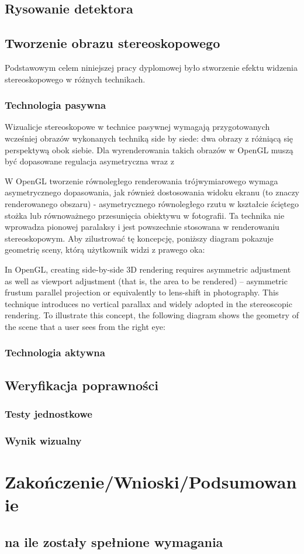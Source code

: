 \subsection{Rysowanie detektora}
\subsection{Tworzenie obrazu stereoskopowego}
Podstawowym celem niniejszej pracy dyplomowej było stworzenie efektu widzenia stereoskopowego w różnych technikach.
\subsubsection{Technologia pasywna}
Wizualicje stereoskopowe w technice pasywnej wymagają przygotowanych wcześniej obrazów wykonanych techniką side by siede: dwa obrazy z różniącą się perspektywą obok siebie. Dla wyrenderowania takich obrazów w OpenGL muszą być dopasowane regulacja asymetryczna wraz z 

W OpenGL tworzenie równoległego renderowania trójwymiarowego wymaga asymetrycznego dopasowania, jak również dostosowania widoku ekranu (to znaczy renderowanego obszaru) - asymetrycznego równoległego rzutu w kształcie ściętego stożka lub równoważnego przesunięcia obiektywu w fotografii. Ta technika nie wprowadza pionowej paralaksy i jest powszechnie stosowana w renderowaniu stereoskopowym. Aby zilustrować tę koncepcję, poniższy diagram pokazuje geometrię sceny, którą użytkownik widzi z prawego oka:




In OpenGL, creating side-by-side 3D rendering requires asymmetric adjustment as well as viewport adjustment (that is, the area to be rendered) – asymmetric frustum parallel projection or equivalently to lens-shift in photography. This technique introduces no vertical parallax and widely adopted in the stereoscopic rendering. To illustrate this concept, the following diagram shows the geometry of the scene that a user sees from the right eye:


\subsubsection{Technologia aktywna} 

\subsection{Weryfikacja poprawności}
\subsubsection{Testy jednostkowe}
\subsubsection{Wynik wizualny}

\section[Zakończenie]{Zakończenie/Wnioski/Podsumowanie}
\subsection{na ile zostały spełnione wymagania}
\newpage



